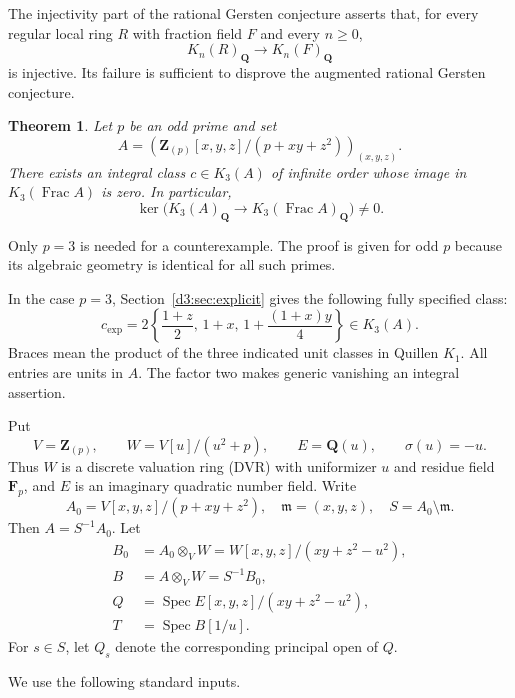 \documentclass[11pt,a4paper]{amsart}
\numberwithin{equation}{section}
\newtheorem{theorem}{Theorem}[section]
\theoremstyle{definition}
\theoremstyle{remark}
\newcommand{\Q}{\mathbf Q}
\newcommand{\Z}{\mathbf Z}
\newcommand{\F}{\mathbf F}
\newcommand{\m}{\mathfrak m}
\newcommand{\Spec}{\operatorname{Spec}}
\newcommand{\Frac}{\operatorname{Frac}}
\newcommand{\Qrat}{_{\Q}}
\begin{document}
The injectivity part of the rational Gersten conjecture asserts that, for every regular local ring $R$ with fraction field $F$ and every $n\geq 0$,
\[
K_n(R)\Qrat\longrightarrow K_n(F)\Qrat
\]
is injective. Its failure is sufficient to disprove the augmented rational Gersten conjecture.

\begin{theorem}\label{d3:thm:main}
Let $p$ be an odd prime and set
\[
A=\left(\Z_{(p)}[x,y,z]/(p+xy+z^2)\right)_{(x,y,z)}.
\]
There exists an integral class $c\in K_3(A)$ of infinite order whose image in $K_3(\Frac A)$ is zero. In particular,
\[
\ker\bigl(K_3(A)\Qrat\longrightarrow K_3(\Frac A)\Qrat\bigr)\neq 0.
\]
\end{theorem}

Only $p=3$ is needed for a counterexample. The proof is given for odd $p$ because its algebraic geometry is identical for all such primes.

In the case $p=3$, Section~\ref{d3:sec:explicit} gives the following fully specified class:
\begin{equation}\label{d3:eq:explicitfront}
\boxed{\quad
c_{\mathrm{exp}}=2\left\{\frac{1+z}{2},\,1+x,\,
1+\frac{(1+x)y}{4}\right\}\in K_3(A).
\quad}
\end{equation}
Braces mean the product of the three indicated unit classes in Quillen $K_1$. All entries are units in $A$. The factor two makes generic vanishing an integral assertion.


Put
\[
V=\Z_{(p)},\qquad W=V[u]/(u^2+p),\qquad E=\Q(u),\qquad \sigma(u)=-u.
\]
Thus $W$ is a discrete valuation ring (DVR) with uniformizer $u$ and residue field $\F_p$, and $E$ is an imaginary quadratic number field. Write
\[
A_0=V[x,y,z]/(p+xy+z^2),\quad \m=(x,y,z),\quad S=A_0\setminus\m.
\]
Then $A=S^{-1}A_0$. Let
\begin{align*}
B_0&=A_0\otimes_VW=W[x,y,z]/(xy+z^2-u^2),\\
B&=A\otimes_VW=S^{-1}B_0,\\
Q&=\Spec E[x,y,z]/(xy+z^2-u^2),\\
T&=\Spec B[1/u].
\end{align*}
For $s\in S$, let $Q_s$ denote the corresponding principal open of $Q$.

We use the following standard inputs.
\end{document}
